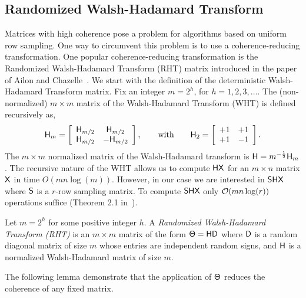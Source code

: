 \subsection{Randomized Walsh-Hadamard Transform}\label{sec:wht}
Matrices with high coherence pose a problem for algorithms based on uniform row sampling. One way to circumvent this problem is to use a coherence-reducing transformation.
One popular coherence-reducing transformation is the Randomized Walsh-Hadamard Transform (RHT) matrix introduced in the paper of Ailon and Chazelle~\cite{FJlT}. We start with the definition of the deterministic Walsh-Hadamard Transform matrix. Fix an integer $m = 2^h$, for $h = 1,2,3, \ldots$. The (non-normalized) $m \times m$ matrix of the Walsh-Hadamard Transform (WHT) is defined recursively as,
%
\[\matH_m = \left[
\begin{array}{cc}
  \matH_{m/2} &  \matH_{m/2} \\
  \matH_{m/2} & -\matH_{m/2}
\end{array}\right],
%
\qquad \mbox{with} \qquad
%
\matH_2 = \left[
\begin{array}{cc}
  +1 & +1 \\
  +1 & -1
\end{array}\right].
\]
%
The $m \times m$ normalized matrix of the Walsh-Hadamard transform is ${\mathsf{H} } = m^{-\frac{1}{2}} {\mathsf{H} }_m$. The recursive nature of the WHT allows us to compute ${\mathsf{H} } {\mathsf{X} }$ for an $m \times n$ matrix ${\mathsf{X} }$ in time $O(m n \log(m))$.
However, in our case we are interested in ${\mathsf{S} } {\mathsf{H} } {\mathsf{X} }$ where ${\mathsf{S} }$ is a $r$-row sampling matrix. To compute ${\mathsf{S} } {\mathsf{H} } {\mathsf{X} }$ only $\mathcal{O}(m n \log(r))$ operations
suffice (Theorem 2.1 in~\cite{AL09}).
\begin{definition}
\label{def:rht}
Let $m = 2^h$ for some positive integer $h$. A \emph{Randomized Walsh-Hadamard Transform (RHT)} is an $m \times m$ matrix of the form ${\mathsf{\Theta} } =  {\mathsf{H} }  {\mathsf{D} } $
where ${\mathsf{D} }$ is a random diagonal matrix of size $m$ whose entries are independent random signs, and ${\mathsf{H} }$ is a normalized Walsh-Hadamard matrix of size $m$.
\end{definition}
The following lemma demonstrate that the application of ${\mathsf{\Theta} }$ reduces the coherence of any fixed matrix.
